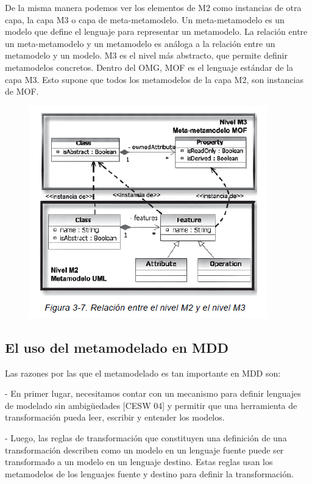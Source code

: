 De la misma manera podemos ver los elementos de M2 como instancias de
otra capa, la capa M3 o capa de meta-metamodelo. Un meta-metamodelo es
un modelo que define el lenguaje para representar un metamodelo. La relación
entre un meta-metamodelo y un metamodelo es análoga a la relación
entre un metamodelo y un modelo.
M3 es el nivel más abstracto, que permite definir metamodelos concretos.
Dentro del OMG, MOF es el lenguaje estándar de la capa M3. Esto supone
que todos los metamodelos de la capa M2, son instancias de MOF.

\begin{figure}[H]
\centering
\includegraphics[scale=0.9]{./Imagenes/modelo13}
\end{figure}

\subsection{El uso del metamodelado en MDD}
Las razones por las que el metamodelado es tan importante en MDD son:

- En primer lugar, necesitamos contar con un mecanismo para definir lenguajes
de modelado sin ambigüedades [CESW 04] y permitir que una herramienta
de transformación pueda leer, escribir y entender los modelos.

- Luego, las reglas de transformación que constituyen una definición
de una transformación describen como un modelo en un lenguaje
fuente puede ser transformado a un modelo en un lenguaje destino.
Estas reglas usan los metamodelos de los lenguajes fuente y destino
para definir la transformación.

